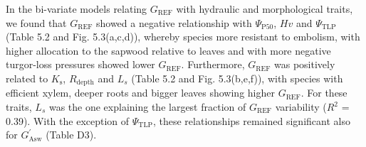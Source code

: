 \documentclass[11pt,twoside]{reedthesis}
\begin{document}
In the bi-variate models relating \(G_{\text{REF}}\) with hydraulic and
morphological traits, we found that \(G_{\text{REF}}\) showed a negative
relationship with \textbar{}\(\Psi_{\text{P50}}\)\textbar{}, \(Hv\) and
\textbar{}\(\Psi_{\text{TLP}}\)\textbar{} (Table 5.2 and Fig.
5.3(a,c,d)), whereby species more resistant to embolism, with higher
allocation to the sapwood relative to leaves and with more negative
turgor-loss pressures showed lower \(G_{\text{REF}}\). Furthermore,
\(G_{\text{REF}}\) was positively related to \(K_\text{s}\),
\(R_{\text{depth}}\) and \(L_s\) (Table 5.2 and Fig. 5.3(b,e,f)), with
species with efficient xylem, deeper roots and bigger leaves showing
higher \(G_{\text{REF}}\). For these traits, \(L_s\) was the one
explaining the largest fraction of \(G_{\text{REF}}\) variability
(\(R^2\) = 0.39). With the exception of \(\Psi_{\text{TLP}}\), these
relationships remained significant also for \(G_{\text{Asw}}^{'}\)
(Table D3).\par
\end{document}
